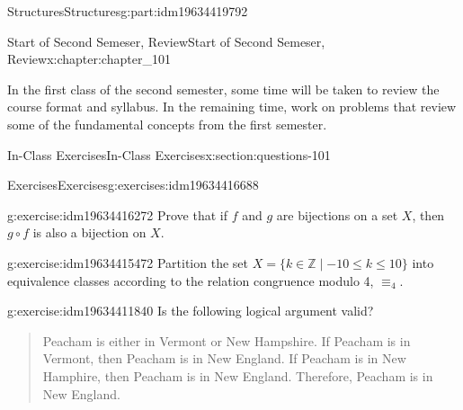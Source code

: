 \documentclass[oneside,10pt,]{book}
\numberwithin{equation}{section}
\begin{document}
\begin{partptx}{Structures}{}{Structures}{}{}{g:part:idm19634419792}
%
\typeout{************************************************}
\typeout{************************************************}
%
\begin{chapterptx}{Start of Second Semeser, Review}{}{Start of Second Semeser, Review}{}{}{x:chapter:chapter_101}
\begin{introduction}{}%
In the first class of the second semester, some time will be taken to review the course format and syllabus.  In the remaining time, work on problems that review some of the fundamental concepts from the first semester.%
\end{introduction}%
%
%
\typeout{************************************************}
\typeout{************************************************}
%
\begin{sectionptx}{In-Class Exercises}{}{In-Class Exercises}{}{}{x:section:questions-101}
%
%
%
\typeout{************************************************}
\typeout{************************************************}
%
\begin{exercises-subsection-numberless}{Exercises}{}{Exercises}{}{}{g:exercises:idm19634416688}
\par\medskip\noindent%
%
\begin{exercisegroup}
\begin{divisionexerciseeg}{1}{}{}{g:exercise:idm19634416272}%
Prove that if \(f\) and \(g\) are bijections on a set \(X\), then \(g \circ f\) is also a bijection on \(X\).%
\end{divisionexerciseeg}%
\begin{divisionexerciseeg}{2}{}{}{g:exercise:idm19634415472}%
Partition the set \(X=\{k \in \mathbb{Z} \mid  -10 \leq k \leq 10\}\) into equivalence classes according to the relation congruence modulo 4, \(\equiv_4\).%
\end{divisionexerciseeg}%
\begin{divisionexerciseeg}{3}{}{}{g:exercise:idm19634411840}%
Is the following logical argument valid?%
\begin{quote}%
Peacham is either in Vermont or New Hampshire. If Peacham is in Vermont, then Peacham is in New England. If Peacham is in New Hamphire, then Peacham is in New England. Therefore, Peacham is in New England.%
\end{quote}
\par\smallskip%

\end{divisionexerciseeg}
\end{exercisegroup}
\end{exercises-subsection-numberless}
\end{sectionptx}
\end{chapterptx}
\end{partptx}
\end{document}
